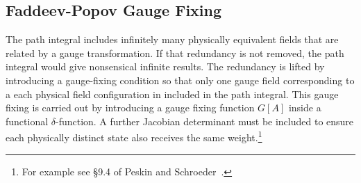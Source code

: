 
\subsection{Faddeev-Popov Gauge Fixing}
\label{sec:gauge_fixing}

The path integral includes infinitely many physically equivalent fields that are related by a gauge transformation.
If that redundancy is not removed, the path integral would give nonsensical infinite results.
The redundancy is lifted by introducing a gauge-fixing condition so that only one gauge field 
corresponding to a each physical field configuration in included in the path integral.  %
This gauge fixing is carried out by introducing a gauge fixing function $G[A]$ inside a functional $\delta$-function.
A further Jacobian determinant must be included to ensure each physically distinct state also receives the same weight.\footnote{
For example see \S 9.4 of Peskin and Schroeder~\cite{Peskin1995}.}

